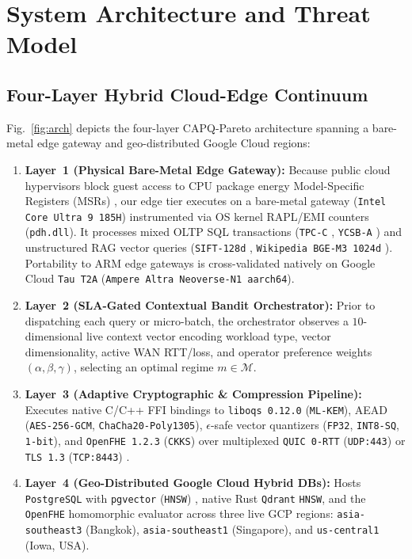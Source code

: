 \documentclass[10pt,journal,compsoc]{IEEEtran}
\begin{document}
\section{System Architecture and Threat Model}\label{sec:arch}
\subsection{Four-Layer Hybrid Cloud-Edge Continuum}
Fig.~\ref{fig:arch} depicts the four-layer CAPQ-Pareto architecture spanning a bare-metal edge gateway and geo-distributed Google Cloud regions:
\begin{enumerate}
    \item \textbf{Layer~1 (Physical Bare-Metal Edge Gateway):} Because public cloud hypervisors block guest access to CPU package energy Model-Specific Registers (MSRs) \cite{khan2018rapl,jay2023power_meters,amaral2023kepler}, our edge tier executes on a bare-metal gateway (\texttt{Intel Core Ultra 9 185H}) instrumented via OS kernel RAPL/EMI counters (\texttt{pdh.dll}). It processes mixed OLTP SQL transactions (\texttt{TPC-C} \cite{tpcc_spec}, \texttt{YCSB-A} \cite{cooper2010ycsb}) and unstructured RAG vector queries (\texttt{SIFT-128d} \cite{jegou2011sift}, \texttt{Wikipedia BGE-M3 1024d} \cite{chen2024bgem3}). Portability to ARM edge gateways is cross-validated natively on Google Cloud \texttt{Tau T2A} (\texttt{Ampere Altra Neoverse-N1 aarch64}).
    \item \textbf{Layer~2 (SLA-Gated Contextual Bandit Orchestrator):} Prior to dispatching each query or micro-batch, the orchestrator observes a $10$-dimensional live context vector encoding workload type, vector dimensionality, active WAN RTT/loss, and operator preference weights $(\alpha,\beta,\gamma)$, selecting an optimal regime $m \in \mathcal{M}$.
    \item \textbf{Layer~3 (Adaptive Cryptographic \& Compression Pipeline):} Executes native C/C++ FFI bindings to \texttt{liboqs~0.12.0} (\texttt{ML-KEM}), AEAD (\texttt{AES-256-GCM}, \texttt{ChaCha20-\allowbreak Poly1305}), $\epsilon$-safe vector quantizers (\texttt{FP32}, \texttt{INT8-SQ}, \texttt{1-bit}), and \texttt{OpenFHE~1.2.3} (\texttt{CKKS}) over multiplexed \texttt{QUIC 0-RTT} (\texttt{UDP:443}) \cite{iyengar2021rfc9000} or \texttt{TLS~1.3} (\texttt{TCP:8443}) \cite{rescorla2018rfc8446}.
    \item \textbf{Layer~4 (Geo-Distributed Google Cloud Hybrid DBs):} Hosts \texttt{PostgreSQL} with \texttt{pgvector} (\texttt{HNSW}) \cite{pgvector2024}, native Rust \texttt{Qdrant} \texttt{HNSW}, and the \texttt{OpenFHE} homomorphic evaluator across three live GCP regions: \texttt{asia-southeast3} (Bangkok), \texttt{asia-southeast1} (Singapore), and \texttt{us-central1} (Iowa, USA).
\end{enumerate}
\end{document}
